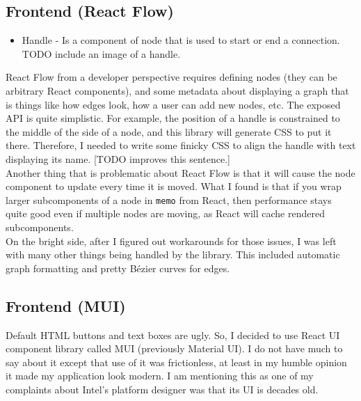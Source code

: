 \documentclass[12pt]{report}
\begin{document}
\subsection{Frontend (React Flow)}

\begin{tcolorbox}[title=Vocabulary]

\begin{itemize}

\item Handle - Is a component of node that is used to start or end a connection. TODO include an image of a handle.

\end{itemize}
\end{tcolorbox}
React Flow from a developer perspective requires defining nodes (they can be arbitrary React components), and some metadata about displaying a graph that is things like how edges look, how a user can add new nodes, etc. 
The exposed API is quite simplistic. 
For example, the position of a handle is constrained to the middle of the side of a node, and this library will generate CSS to put it there. 
Therefore, I needed to write some finicky CSS to align the handle with text displaying its name. [TODO improves this sentence.]
\\
Another thing that is problematic about React Flow is that it will cause the node component to update every time it is moved.
What I found is that if you wrap larger subcomponents of a node in \verb!memo! from React, then performance stays quite good even if multiple nodes are moving, as React will cache rendered subcomponents.
\\
On the bright side, after I figured out workarounds for those issues, I was left with many other things being handled by the library. This included automatic graph formatting and pretty Bézier curves for edges. 

\subsection{Frontend (MUI)}

Default HTML buttons and text boxes are ugly. So, I decided to use React UI component library called MUI (previously Material UI). I do not have much to say about it except that use of it was frictionless, at least in my humble opinion it made my application look modern. I am mentioning this as one of my complaints about Intel's platform designer was that its UI is decades old.
 
\end{document}
